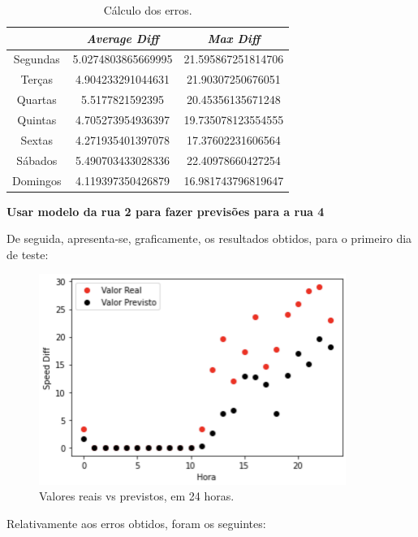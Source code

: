 \documentclass[a4paper, 12pt]{article}
\begin{document}
\begin{table}[H]
	\centering
	\begin{tabular}{||c||c|c||}
		\hline\hline
		& \textit{Average Diff} & \textit{Max Diff} \\
		\hline\hline
		Segundas & 5.0274803865669995
 & 21.595867251814706 \\
		\hline
		Terças  &
4.904233291044631
 & 21.90307250676051 \\
		\hline
		Quartas & 5.5177821592395
 & 20.45356135671248	\\
		\hline
		Quintas  & 
4.705273954936397 & 19.735078123554555	\\
		\hline
		Sextas & 
4.271935401397078 & 17.37602231606564 \\
		\hline
		Sábados  & 
5.490703433028336 & 22.40978660427254 \\
		\hline
		Domingos & 4.119397350426879
 & 
16.981743796819647
\\
		\hline\hline
	\end{tabular}
	\label{table:mod2_rua3}
	\caption{Cálculo dos erros.}
\end{table}

\vspace{0.5cm}
\textbf{Usar modelo da rua 2 para fazer previsões para a rua 4}

De seguida, apresenta-se, graficamente, os resultados obtidos, para o primeiro dia de teste:

\begin{figure}[H]
	\centering
	\includegraphics[width=10cm]{resultados/real_prev_mod2_rua4.png}
	\caption{Valores reais vs previstos, em 24 horas.}
\end{figure}

Relativamente aos erros obtidos, foram os seguintes:
\end{document}
